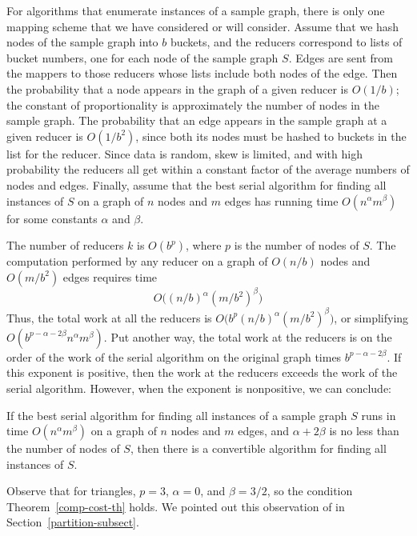 For algorithms that enumerate instances of a sample graph, there is only one mapping scheme that we have considered or will consider.
Assume that we hash nodes of the sample graph into $b$ buckets, and the reducers correspond to lists of bucket numbers, one for each node of the sample graph $S$.
Edges are sent from the mappers to those reducers whose lists include both nodes of the edge.  Then the probability that a node appears in the graph of a given reducer is $O(1/b)$; the constant of proportionality is approximately the number of nodes in the sample graph.  The probability that an edge appears in the sample graph at a given reducer is $O(1/b^2)$, since both its nodes must be hashed to buckets in the list for the reducer.  Since data is random, skew is limited, and with high probability the reducers all get within a constant factor of the average numbers of nodes and edges.  Finally, assume that the best serial algorithm for finding all instances of $S$ on a graph of $n$ nodes and $m$ edges has running time $O(n^{\alpha}m^{\beta})$ for some constants $\alpha$ and $\beta$.

The number of reducers $k$ is $O(b^p)$, where $p$ is the number of nodes of $S$.
The computation performed by any reducer on a graph of $O(n/b)$ nodes and $O(m/b^2)$ edges requires time
$$O\bigl((n/b)^{\alpha}(m/b^2)^{\beta}\bigr)$$
Thus, the total work at all the reducers is $O\bigl(b^p (n/b)^{\alpha}(m/b^2)^{\beta}\bigr)$, or simplifying $O(b^{p-\alpha-2\beta}n^{\alpha}m^{\beta})$.  Put another way, the total work at the reducers is on the order of the work of the serial algorithm on the original graph times $b^{p-\alpha-2\beta}$.  If this exponent is positive, then the work at the reducers exceeds the work of the serial algorithm.  However, when the exponent is nonpositive, we can conclude:

\begin{theorem}
\label{comp-cost-th}
If the best serial algorithm for finding all instances of a sample graph $S$ runs in time $O(n^{\alpha}m^{\beta})$ on a graph of $n$ nodes and $m$ edges, and $\alpha+2\beta$ is no less than the number of nodes of $S$, then there is a convertible algorithm for finding all instances of $S$.
\end{theorem}

\begin{example}
\label{comp-tri-ex}
Observe that for triangles, $p=3$, $\alpha=0$, and $\beta=3/2$, so the condition Theorem~\ref{comp-cost-th} holds.  We pointed out this observation of \cite{SV11} in Section~\ref{partition-subsect}.
\end{example}

